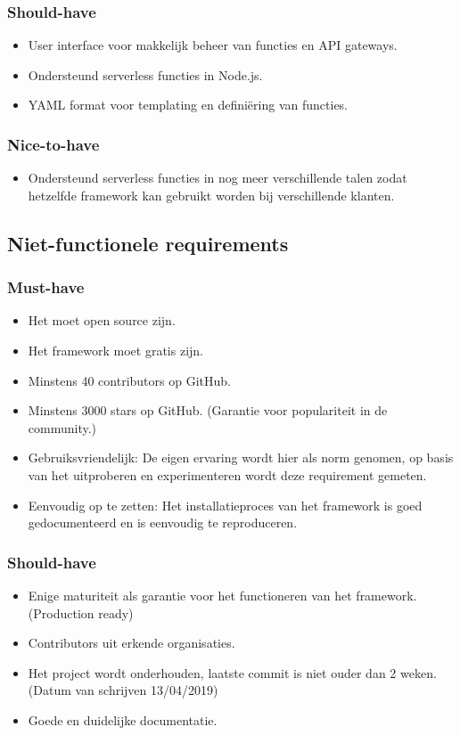 \subsubsection{Should-have}
\begin{itemize}
    \item User interface voor makkelijk beheer van functies en API gateways.
    \item Ondersteund serverless functies in Node.js.
    \item YAML format voor templating en definiëring van functies.
\end{itemize}
\subsubsection{Nice-to-have}
\begin{itemize}
    \item Ondersteund serverless functies in nog meer verschillende talen zodat hetzelfde framework kan gebruikt worden bij verschillende klanten.
\end{itemize}
\subsection{Niet-functionele requirements}
\subsubsection{Must-have}
\begin{itemize}
    \item Het moet open source zijn.
    \item Het framework moet gratis zijn.
    \item Minstens 40 contributors op GitHub.
    \item Minstens 3000 stars op GitHub. (Garantie voor populariteit in de community.)
    \item Gebruiksvriendelijk: De eigen ervaring wordt hier als norm genomen, op basis van het uitproberen en experimenteren wordt deze requirement gemeten.
    \item Eenvoudig op te zetten: Het installatieproces van het framework is goed gedocumenteerd en is eenvoudig te reproduceren.
\end{itemize}
\subsubsection{Should-have}
\begin{itemize}
    \item Enige maturiteit als garantie voor het functioneren van het framework. (Production ready)
    \item Contributors uit erkende organisaties.
    \item Het project wordt onderhouden, laatste commit is niet ouder dan 2 weken. (Datum van schrijven 13/04/2019)
    \item Goede en duidelijke documentatie.
\end{itemize}
